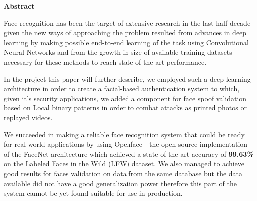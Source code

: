 \thispagestyle{plain}

\vspace*{\fill}

\begin{center}
	\Large \textbf{Abstract}	
\end{center}

Face recognition has been the target of extensive research in the last half decade given the new ways of approaching the problem resulted from advances in deep learning by making possible end-to-end learning of the task using Convolutional Neural Networks and from the growth in size of available training datasets necessary for these methods to reach state of the art performance. 

In the project this paper will further describe, we employed such a deep learning architecture in order to create a facial-based authentication system to which, given it's security applications, we added a component for face spoof validation based on Local binary patterns in order to combat attacks as printed photos or replayed videos.

We succeeded in making a reliable face recognition system that could be ready for real world applications by using Openface \cite{amos2016openface} - the open-source implementation of the FaceNet \cite{DBLP:journals/corr/SchroffKP15} architecture which achieved a state of the art accuracy of \textbf{99.63\%}  on the Labeled Faces in the Wild (LFW) dataset. We also managed to achieve good results for faces validation on data from the same database but the data available did not have a good generalization power therefore this part of the system cannot be yet found suitable for use in production.


\vspace*{\fill}
